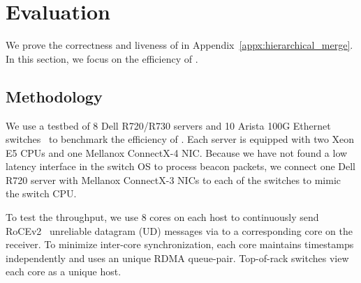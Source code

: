 \section{Evaluation}
\label{sec:evaluation}


We prove the correctness and liveness of \sys in Appendix~\ref{appx:hierarchical_merge}.
In this section, we focus on the efficiency of \sys.

\subsection{Methodology}
\label{sec:testbed}

We use a testbed of 8 Dell R720/R730 servers and 10 Arista 100G Ethernet switches~\cite{arista} to benchmark the efficiency of \sys. %
Each server is equipped with two Xeon E5 CPUs and one Mellanox ConnectX-4 NIC. Because we have not found a low latency interface in the switch OS to process beacon packets, we connect one Dell R720 server with Mellanox ConnectX-3 NICs to each of the switches to mimic the switch CPU. %

To test the throughput, we use 8 cores on each host to continuously send RoCEv2~\cite{infinibandrocev2} unreliable datagram (UD) messages via \sys to a corresponding core on the receiver. To minimize inter-core synchronization, each core maintains timestamps independently and uses an unique RDMA queue-pair. Top-of-rack switches view each core as a unique host.


\begin{table}[t]
\centering
{}
\caption{Network topologies for evaluation.}
\label{tab:eval-topology}
\end{table}

